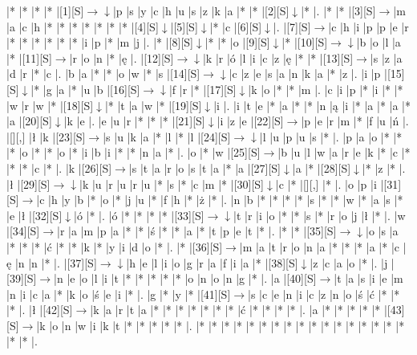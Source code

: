 \documentclass[11pt]{article}
\newcommand\drarr{$\rightarrow \!\!\!\!\! \downarrow$}
\newcommand\rarr{$\rightarrow$}
\newcommand\darr{$\downarrow$}
\begin{document}
\noindent\begin{Puzzle}{18}{27}|*	|*	|*	|*	|[1][S]\drarr	|p	|s	|y	|c	|h	|u	|s	|z	|k	|a	|*	|*	|[2][S]\darr	|*	|.
|*	|*	|[3][S]\rarr	|m	|a	|c	|h	|*	|*	|*	|*	|*	|*	|*	|[4][S]\darr	|[5][S]\darr	|*	|c	|[6][S]\darr	|.
|[7][S]\rarr	|c	|h	|i	|p	|p	|e	|r	|*	|*	|*	|*	|*	|*	|i	|p	|*	|m	|j	|.
|*	|[8][S]\darr	|*	|*	|o	|[9][S]\darr	|*	|[10][S]\drarr	|b	|o	|l	|a	|*	|[11][S]\rarr	|r	|o	|n	|*	|ę	|.
|[12][S]\drarr	|k	|r	|ó	|l	|i	|c	|z	|ę	|*	|*	|[13][S]\rarr	|s	|z	|a	|d	|r	|*	|c	|.
|b	|a	|*	|*	|o	|w	|*	|s	|[14][S]\drarr	|c	|z	|e	|s	|a	|n	|k	|a	|*	|z	|.
|i	|p	|[15][S]\darr	|*	|g	|a	|*	|u	|b	|[16][S]\drarr	|f	|r	|*	|[17][S]\darr	|k	|o	|*	|*	|m	|.
|c	|i	|p	|*	|i	|*	|*	|w	|r	|w	|*	|[18][S]\darr	|*	|t	|a	|w	|*	|[19][S]\darr	|i	|.
|i	|t	|e	|*	|a	|*	|*	|n	|ą	|i	|*	|a	|*	|a	|*	|a	|[20][S]\darr	|k	|e	|.
|e	|u	|r	|*	|*	|*	|[21][S]\darr	|i	|z	|e	|[22][S]\rarr	|p	|e	|r	|m	|*	|f	|u	|ń	|.
|[][,]{ }	|ł	|k	|[23][S]\rarr	|s	|u	|k	|a	|*	|l	|*	|l	|[24][S]\drarr	|l	|u	|p	|u	|s	|*	|.
|p	|a	|o	|*	|*	|*	|o	|*	|*	|o	|*	|i	|b	|i	|*	|*	|n	|a	|*	|.
|o	|*	|w	|[25][S]\rarr	|b	|u	|l	|w	|a	|r	|e	|k	|*	|c	|*	|*	|*	|c	|*	|.
|k	|[26][S]\rarr	|s	|t	|a	|r	|o	|s	|t	|a	|*	|a	|[27][S]\darr	|a	|*	|[28][S]\darr	|*	|z	|*	|.
|ł	|[29][S]\drarr	|k	|u	|r	|u	|r	|u	|*	|s	|*	|c	|m	|*	|[30][S]\darr	|c	|*	|[][,]{ }	|*	|.
|o	|p	|i	|[31][S]\rarr	|c	|h	|y	|b	|*	|o	|*	|j	|u	|*	|f	|h	|*	|ż	|*	|.
|n	|b	|*	|*	|*	|*	|s	|*	|*	|w	|*	|a	|s	|*	|e	|ł	|[32][S]\darr	|ó	|*	|.
|ó	|*	|*	|*	|*	|[33][S]\drarr	|t	|r	|i	|o	|*	|*	|s	|*	|r	|o	|j	|ł	|*	|.
|w	|[34][S]\rarr	|r	|a	|m	|p	|a	|*	|*	|ś	|*	|*	|a	|*	|t	|p	|e	|t	|*	|.
|*	|*	|[35][S]\drarr	|o	|s	|a	|*	|*	|*	|ć	|*	|*	|k	|*	|y	|i	|d	|o	|*	|.
|*	|[36][S]\rarr	|m	|a	|t	|r	|o	|n	|a	|*	|*	|*	|a	|*	|c	|ę	|n	|n	|*	|.
|[37][S]\drarr	|h	|e	|l	|i	|o	|g	|r	|a	|f	|i	|a	|*	|[38][S]\darr	|z	|c	|a	|o	|*	|.
|j	|[39][S]\rarr	|n	|e	|o	|l	|i	|t	|*	|*	|*	|*	|*	|o	|n	|o	|n	|g	|*	|.
|a	|[40][S]\rarr	|t	|a	|s	|i	|e	|m	|n	|i	|c	|a	|*	|k	|o	|ś	|e	|i	|*	|.
|g	|*	|y	|*	|[41][S]\rarr	|s	|c	|e	|n	|i	|c	|z	|n	|o	|ś	|ć	|*	|*	|*	|.
|ł	|[42][S]\rarr	|k	|a	|r	|t	|a	|*	|*	|*	|*	|*	|*	|*	|ć	|*	|*	|*	|*	|.
|a	|*	|*	|*	|*	|*	|[43][S]\rarr	|k	|o	|n	|w	|i	|k	|t	|*	|*	|*	|*	|*	|.
|*	|*	|*	|*	|*	|*	|*	|*	|*	|*	|*	|*	|*	|*	|*	|*	|*	|*	|*	|.\end{Puzzle}

\newpage
\end{document}
